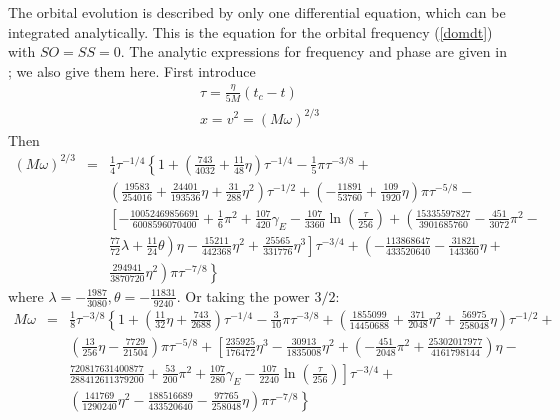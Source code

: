 \documentclass[11pt]{report}
\def\bea{\begin{eqnarray}}
\def\ena{\end{eqnarray}}
\begin{document}
The orbital evolution is described by only one differential equation, which can
be integrated analytically. This is the equation for the orbital frequency
(\ref{domdt}) with $SO=SS=0$. 
The analytic expressions for frequency and phase are given in \cite{Blanchet};
we also give them here. First introduce 
\bea
\tau = \frac{\eta}{5M}(t_c - t)\\
x = v^2 = (M\omega)^{2/3}
\ena
Then 
\bea
(M\omega)^{2/3}&=&\frac1{4}\tau^{-1/4}\left\{ 1 + \left(\frac{743}{4032} + \frac{11}{48}\eta\right)
\tau^{-1/4} - \frac1{5}\pi \tau^{-3/8} + \right.\nonumber \\
& &\left. \left( \frac{19583}{254016} + \frac{24401}{193536}\eta + \frac{31}{288}\eta^2\right)
\tau^{-1/2} + \left(-\frac{11891}{53760} + \frac{109}{1920}\eta\right)\pi \tau^{-5/8} -
\right. \nonumber \\
& & \left. \left[ -\frac{10052469856691}{6008596070400} + \frac1{6}\pi^2 + 
\frac{107}{420}\gamma_E - \frac{107}{3360}\ln\left(\frac{\tau}{256}\right) 
+ \left(\frac{15335597827}{3901685760} - \frac{451}{3072}\pi^2 - 
 \right. \right. \right. \nonumber \\
& & \left. \left. \left. \frac{77}{72}\lambda + \frac{11}{24}\theta \right)\eta -
 \frac{15211}{442368}\eta^2 + \frac{25565}{331776}\eta^3 \right]
\tau^{-3/4} + \left(-\frac{113868647}{433520640} - \frac{31821}{143360}\eta + 
\right. \right. \nonumber \\
& & \left. \left. \frac{294941}{3870720}\eta^2\right)\pi\tau^{-7/8}  \right\}
\ena
where $\lambda = -\frac{1987}{3080}, \theta=-\frac{11831}{9240}$.
Or taking the power $3/2$:
\bea
M\omega &=& \frac1{8} \tau^{-3/8}\left\{ 1 + \left( \frac{11}{32}\eta + \frac{743}{2688}\right) 
\tau^{-1/4} - \frac{3}{10}\pi\tau^{-3/8} 
+ \left(\frac{1855099}{14450688} + \frac{371}{2048}\eta^2 + \frac{56975}{258048}\eta\right)
\tau^{-1/2} + \right. \nonumber \\
& &\left.\left( \frac{13}{256}\eta- \frac{7729}{21504}\right)\pi \tau^{-5/8} +
\left[ \frac{235925}{176472}\eta^3 - \frac{30913}{1835008}\eta^2 + \left(-\frac{451}{2048} \pi^2+ 
\frac{25302017977}{4161798144}\right) \eta -\right. \right. \nonumber \\
& & \left. \left.
\frac{720817631400877}{288412611379200} + \frac{53}{200}\pi^2 + \frac{107}{280}\gamma_E - 
\frac{107}{2240}\ln\left(\frac{\tau}{256}\right) \right]\tau^{-3/4} +
\right. \nonumber \\
& & \left. \left(\frac{141769}{1290240}\eta^2- \frac{188516689}{433520640} -\frac{97765}{258048}\eta\right) 
\pi\tau^{-7/8}
\right\}
\label{omNosp}
\ena
\end{document}

